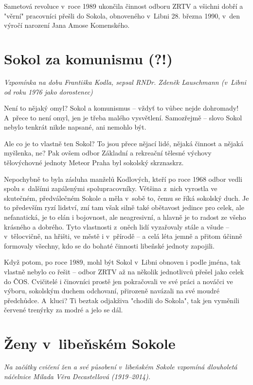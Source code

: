 \documentclass[a5paper, 11pt, twoside]{article}
\begin{document}
Sametová revoluce v~roce 1989 ukončila činnost odboru ZRTV a všichni
dobří a "věrní" pracovníci přešli do Sokola, obnoveného v~Libni 28.
března 1990, v~den výročí narození Jana Amose Komenského.

\section{Sokol za komunismu (?!)}

\begin{center}
\textit{Vzpomínka na dobu Františka Kodla, sepsal RNDr. Zdeněk Lauschmann (v~Libni od roku 1976 jako dorostenec)}
\end{center}

Není to nějaký omyl? Sokol a komunismus -- vždyť to vůbec nejde
dohromady! A~přece to není omyl, jen je třeba malého vysvětlení.
Samozřejmě -- slovo Sokol nebylo tenkrát nikde napsané, ani nemohlo být.

Ale co je to vlastně ten Sokol? To jsou přece nějací lidé, nějaká
činnost a nějaká myšlenka, ne? Pak ovšem odbor Základní a rekreační
tělesné výchovy tělovýchovné jednoty Meteor Praha byl sokolský
skrznaskrz.

Nepochybně to byla zásluha manželů Kodlových, kteří po roce 1968 odbor
vedli spolu s~dalšími zapálenými spolupracovníky. Většina z~nich
vyrostla ve skutečném, předválečném Sokole a měla v~sobě to, čemu se
říká sokolský duch. Je to především ryzí lidství, zní tam však silně
také obětavost jedince pro celek, ale nefanatická, je to elán i
bojovnost, ale neagresivní, a hlavně je to radost ze všeho krásného a
dobrého. Tyto vlastnosti z~oněch lidí vyzařovaly stále a všude --
v~tělocvičně, na hřišti, ve městě i v~přírodě -- a celá léta jemně a
přitom účinně formovaly všechny, kdo se do bohaté činnosti libeňské
jednoty zapojili.

Když potom, po roce 1989, mohl být Sokol v~Libni obnoven i podle jména,
tak vlastně nebylo co řešit -- odbor ZRTV až na několik jednotlivců
přešel jako celek do ČOS. Cvičitelé i činovníci prostě jen pokračovali
ve své práci a nováčci ve výboru, sokolským duchem odchovaní, přirozeně
navázali na své moudré předchůdce. A~kluci? Ti beztak odjakživa "chodili
do Sokola", tak jen vyměnili červené trenýrky za modré a jelo se dál.

\section{Ženy v~libeňském
Sokole}

\begin{center}
  \textit{Na začátky cvičení žen a své působení v~libeňském Sokole vzpomíná dlouholetá náčelnice Milada Věra Decastellová (1919--2014).}
\end{center}
\end{document}
